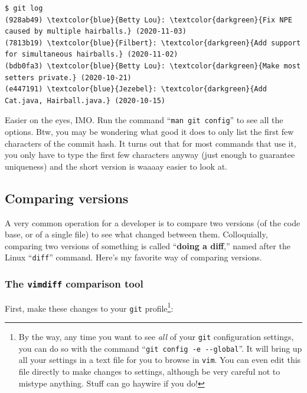 \begin{Verbatim}[commandchars=\\\{\},fontsize=\scriptsize,samepage=true,frame=single]
$ git log
(928ab49) \textcolor{blue}{Betty Lou}: \textcolor{darkgreen}{Fix NPE caused by multiple hairballs.} (2020-11-03)
(7813b19) \textcolor{blue}{Filbert}: \textcolor{darkgreen}{Add support for simultaneous hairballs.} (2020-11-02)
(bdb0fa3) \textcolor{blue}{Betty Lou}: \textcolor{darkgreen}{Make most setters private.} (2020-10-21)
(e447191) \textcolor{blue}{Jezebel}: \textcolor{darkgreen}{Add Cat.java, Hairball.java.} (2020-10-15)
\end{Verbatim}

Easier on the eyes, IMO. Run the command ``\texttt{man git config}'' to see
all the options. Btw, you may be wondering what good it does to only list the
first few characters of the commit hash. It turns out that for most commands
that use it, you only have to type the first few characters anyway (just
enough to guarantee uniqueness) and the short version is waaaay easier to look
at.

\subsection{Comparing versions}

A very common operation for a developer is to compare two versions (of the
code base, or of a single file) to see what changed between them.
Colloquially, comparing two versions of something is called ``\textbf{doing a
diff},'' named after the Linux ``\texttt{diff}'' command. Here's my favorite
way of comparing versions.

\subsubsection{The \texttt{vimdiff} comparison tool}

First, make these changes to your \texttt{git} profile\footnote{By the way,
any time you want to see \textit{all} of your \texttt{git} configuration
settings, you can do so with the command ``\texttt{git config -e -{}-global}''.
It will bring up all your settings in a text file for you to browse in
\texttt{vim}. You can even edit this file directly to make changes to
settings, although be very careful not to mistype anything. Stuff can go
haywire if you do!}:


